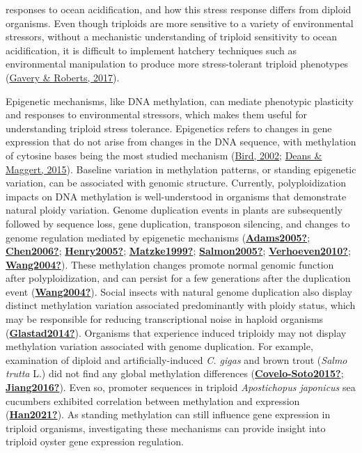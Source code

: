 \documentclass [11pt, proquest] {uwthesis}[2015/03/03]
\begin{document}
responses to ocean acidification, and how this stress response differs from diploid organisms. Even though triploids are more sensitive to a variety of environmental stressors, without a mechanistic understanding of triploid sensitivity to ocean acidification, it is difficult to implement hatchery techniques such as environmental manipulation to produce more stress-tolerant triploid phenotypes (\protect\hyperlink{ref-Gavery2017}{Gavery \& Roberts, 2017}).

Epigenetic mechanisms, like DNA methylation, can mediate phenotypic plasticity and responses to environmental stressors, which makes them useful for understanding triploid stress tolerance. Epigenetics refers to changes in gene expression that do not arise from changes in the DNA sequence, with methylation of cytosine bases being the most studied mechanism (\protect\hyperlink{ref-Bird2002}{Bird, 2002}; \protect\hyperlink{ref-Deans2015}{Deans \& Maggert, 2015}). Baseline variation in methylation patterns, or standing epigenetic variation, can be associated with genomic structure. Currently, polyploidization impacts on DNA methylation is well-understood in organisms that demonstrate natural ploidy variation. Genome duplication events in plants are subsequently followed by sequence loss, gene duplication, transposon silencing, and changes to genome regulation mediated by epigenetic mechanisms (\protect\hyperlink{ref-Adams2005}{\textbf{Adams2005?}}; \protect\hyperlink{ref-Chen2006}{\textbf{Chen2006?}}; \protect\hyperlink{ref-Henry2005}{\textbf{Henry2005?}}; \protect\hyperlink{ref-Matzke1999}{\textbf{Matzke1999?}}; \protect\hyperlink{ref-Salmon2005}{\textbf{Salmon2005?}}; \protect\hyperlink{ref-Verhoeven2010}{\textbf{Verhoeven2010?}}; \protect\hyperlink{ref-Wang2004}{\textbf{Wang2004?}}). These methylation changes promote normal genomic function after polyploidization, and can persist for a few generations after the duplication event (\protect\hyperlink{ref-Wang2004}{\textbf{Wang2004?}}). Social insects with natural genome duplication also display distinct methylation variation associated predominantly with ploidy status, which may be responsible for reducing transcriptional noise in haploid organisms (\protect\hyperlink{ref-Glastad2014}{\textbf{Glastad2014?}}). Organisms that experience induced triploidy may not display methylation variation associated with genome duplication. For example, examination of diploid and artificially-induced \emph{C. gigas} and brown trout (\emph{Salmo trutta} L.) did not find any global methylation differences (\protect\hyperlink{ref-Covelo-Soto2015}{\textbf{Covelo-Soto2015?}}; \protect\hyperlink{ref-Jiang2016}{\textbf{Jiang2016?}}). Even so, promoter sequences in triploid \emph{Apostichopus japonicus} sea cucumbers exhibited correlation between methylation and expression (\protect\hyperlink{ref-Han2021}{\textbf{Han2021?}}). As standing methylation can still influence gene expression in triploid organisms, investigating these mechanisms can provide insight into triploid oyster gene expression regulation.
\end{document}
